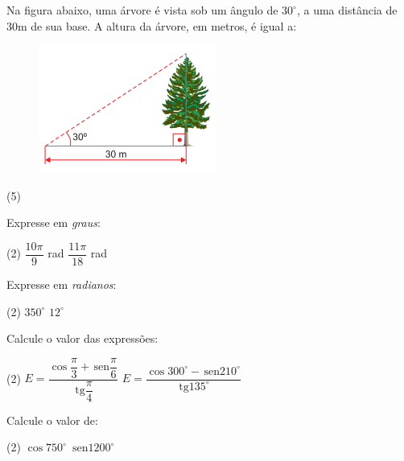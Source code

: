 \documentclass[a4paper,11pt,addpoints]{exam}
\providecommand{\sin}{} \renewcommand{\sin}{\hspace{2pt}\mathrm{sen}}
\providecommand{\tan}{} \renewcommand{\tan}{\hspace{2pt}\mathrm{tg}}
\begin{document}
\begin{questions}
\question[2] 

Na figura abaixo, uma árvore é vista sob um ângulo de $30^\circ$, a uma distância de $30$m de sua base. A altura da árvore, em metros, é igual a: 

\begin{figure}[H]
  \centering
  \includegraphics[width=.4\linewidth]{figures/1.png}
\end{figure}

\begin{tasks}(5)
\end{tasks}

\question[2]

Expresse em \textit{graus}:

\begin{tasks}(2)
  \task $\dfrac{10\pi}{9}$ rad
  \task $\dfrac{11\pi}{18}$ rad
\end{tasks}

\question[2]

Expresse em \textit{radianos}:

\begin{tasks}(2)
  \task $350^\circ$
  \task $12^\circ$
\end{tasks}

\question[2]

Calcule o valor das expressões:

\begin{tasks}(2)
  \task $E = \dfrac{\cos \dfrac{\pi}{3} + \sin \dfrac{\pi}{6}}{\tan \dfrac{\pi}{4}}$
  \task $E = \dfrac{\cos 300^\circ - \sin 210^\circ}{\tan 135^\circ}$
\end{tasks}

\question[2]

Calcule o valor de:

\begin{tasks}(2)
  \task $\cos 750^\circ$
  \task $\sin 1200^\circ$
\end{tasks}

\end{questions}
\end{document}
